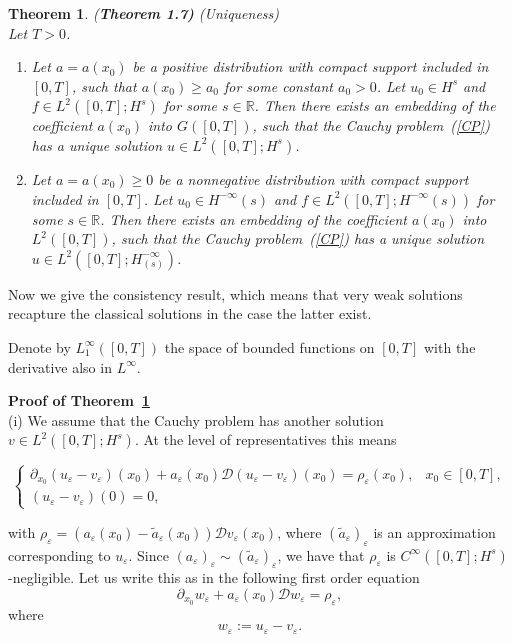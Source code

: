 \documentclass[12pt]{amsart}
\newtheorem{theorem}{Theorem}[section]
\theoremstyle{definition}
\begin{document}

\begin{theorem}{(\bf Theorem 1.7)}
\label{th1.7}(Uniqueness)\\
Let $T > 0$.
\begin{enumerate}
    \item[(i)] Let $a = a(x_0)$ be a positive distribution with compact support included in $[0, T]$, such that $a(x_0) \geq a_0$ for some constant $a_0 > 0$. Let $u_0 \in H^s$ and $f \in L^2([0, T]; H^s)$ for some $s \in \mathbb{R}$. Then there exists an embedding of the coefficient $a(x_0)$ into $G([0, T])$, such that the Cauchy problem~(\ref{CP}) has a unique solution $u \in L^2([0, T]; H^s)$.
    
    \item[(ii)] Let $a = a(x_0) \geq 0$ be a nonnegative distribution with compact support included in $[0, T]$. Let $u_0\in H^{-\infty}(s)$ and $f \in L^2([0, T]; H^{-\infty}(s))$ for some $s \in \mathbb{R}$. Then there exists an embedding of the coefficient $a(x_0)$ into $L^2([0,T])$, such that the Cauchy problem~(\ref{CP}) has a unique solution $u \in L^2([0,T]; H_{(s)}^{-\infty})$.
\end{enumerate}
\end{theorem}
Now we give the consistency result, which means that very weak solutions recapture the classical solutions in the case the latter exist. 

Denote by $L_{1}^{\infty}([0,T])$ the space of bounded functions on $[0,T]$ with the derivative also in $L^{\infty}$.

\vspace{0.5cm}


\textbf{Proof of Theorem~\ref{th1.7}}\\
(i) We assume that the Cauchy problem has another solution $v \in L^2([0, T]; H^s)$. At the level of representatives this means

\[
\begin{cases}
\partial_{x_0} (u_\varepsilon - v_\varepsilon)(x_0) + a_\varepsilon(x_0)\mathcal{D}(u_\varepsilon - v_\varepsilon)(x_0) = \rho_\varepsilon(x_0), & x_0 \in [0, T], \\
(u_\varepsilon - v_\varepsilon)(0) = 0,
\end{cases}
\]

with  $\rho_\varepsilon = ( a_\varepsilon(x_0)-\widetilde{a}_\varepsilon(x_0) )\mathcal{D}v_\varepsilon(x_0)$, where $(\widetilde{a}_\varepsilon)_\varepsilon$ is an approximation corresponding to $u_\varepsilon$. Since $(a_\varepsilon)_\varepsilon \sim (\widetilde{a}_\varepsilon)_\varepsilon$, we have that $\rho_\varepsilon$ is $C^\infty([0, T]; H^s)$-negligible. Let us write this as in the following first order equation
\[
\partial_{x_0} w_{\varepsilon} +  a_\varepsilon(x_0)\mathcal{D}  w_{\varepsilon} =\rho_\varepsilon,
\]
where
\[
w_{\varepsilon} := u_\varepsilon - v_\varepsilon.
\]
\end{document}
